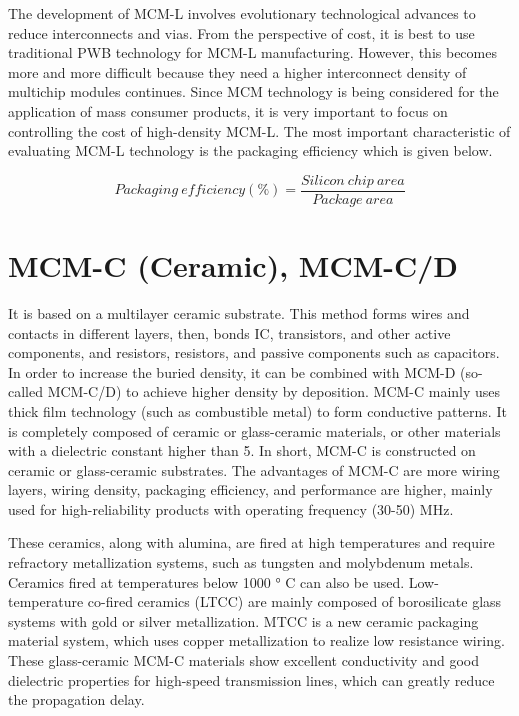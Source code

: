 \begin{spacing}{1.5}
The development of MCM-L involves evolutionary technological advances to reduce interconnects and vias. From the perspective of cost, it is best to use traditional PWB technology for MCM-L manufacturing. However, this becomes more and more difficult because they need a higher interconnect density of multichip modules continues. Since MCM technology is being considered for the application of mass consumer products, it is very important to focus on controlling the cost of high-density MCM-L. The most important characteristic of evaluating MCM-L technology is the packaging efficiency which is given below.

\begin{equation}
	Packaging\ efficiency(\%)=\frac{Silicon\ chip\ area}{Package\ area}
\end{equation}

\section{MCM-C (Ceramic), MCM-C/D}

It is based on a multilayer ceramic substrate. This method forms wires and contacts in different layers, then, bonds IC, transistors, and other active components, and resistors, resistors, and passive components such as capacitors. In order to increase the buried density, it can be combined with MCM-D (so-called MCM-C/D) to achieve higher density by deposition. MCM-C mainly uses thick film technology (such as combustible metal) to form conductive patterns. It is completely composed of ceramic or glass-ceramic materials, or other materials with a dielectric constant higher than 5. In short, MCM-C is constructed on ceramic or glass-ceramic substrates. The advantages of MCM-C are more wiring layers, wiring density, packaging efficiency, and performance are higher, mainly used for high-reliability products with operating frequency (30-50) MHz.

These ceramics, along with alumina, are fired at high temperatures and require refractory metallization systems, such as tungsten and molybdenum metals. Ceramics fired at temperatures below 1000 ° C can also be used. Low-temperature co-fired ceramics (LTCC) are mainly composed of borosilicate glass systems with gold or silver metallization. MTCC is a new ceramic packaging material system, which uses copper metallization to realize low resistance wiring. These glass-ceramic MCM-C materials show excellent conductivity and good dielectric properties for high-speed transmission lines, which can greatly reduce the propagation delay.


\end{spacing}
